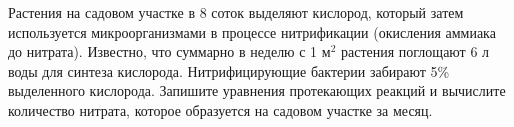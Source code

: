 
Растения на садовом участке в 8 соток выделяют кислород, который затем 
используется микроорганизмами в процессе нитрификации (окисления аммиака до нитрата). Известно, что суммарно в неделю
с 1 м$^2$ растения поглощают 6 л воды для синтеза кислорода. Нитрифицирующие бактерии забирают 5\% выделенного кислорода. 
Запишите уравнения протекающих реакций и вычислите количество
нитрата, которое образуется на садовом участке за месяц.

